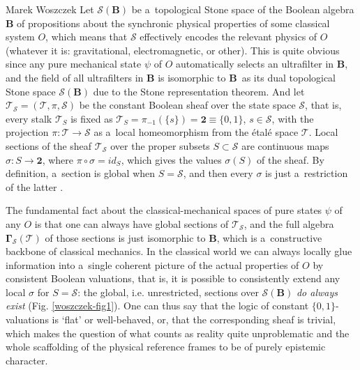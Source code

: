 \begin{artengenv}{Marek Woszczek}
Let $\mathcal{S}(\bm{B})$ be a~topological Stone space of the Boolean algebra $\bm{B}$ of propositions about the synchronic physical properties of some classical system $O$, which means that $\mathcal{S}$ effectively encodes the relevant physics of $O$ (whatever it is: gravitational, electromagnetic, or other). This is quite obvious since any pure mechanical state $\psi $ of $O$ automatically selects an ultrafilter in $\bm{B}$, and the field of all ultrafilters in $\bm{B}$ is isomorphic to $\bm{B}$~as its dual topological Stone space $\mathcal{S}(\bm{B})$ due to the Stone representation theorem. And let $\bm{\mathcal{T}}_{\mathcal{S}} = (\mathcal{T}, \pi, \mathcal{S})$ be the constant Boolean sheaf over the state space $\mathcal{S}$, that is, every stalk $\mathcal{T}_{S}$ is fixed as $\mathcal{T}_{S} = \pi_{-1}(\{s\}) = \bm{2} \equiv \{0,1\}$, $s{\in}\mathcal{S}$, with the projection $\pi:\mathcal{T}\to\mathcal{S}$ as a~local homeomorphism from the étalé space $\mathcal{T}$. Local sections of the sheaf $\bm{\mathcal{T}}_{\mathcal{S}}$ over the proper subsets $S{\subset}\mathcal{S}$ are continuous maps $\sigma :S\to \mathbf{2}$, where $\pi \circ \sigma = id_S$, which gives the values $\sigma(S)$ of the sheaf. By definition, a~section is global when $S = \mathcal{S}$, and then every $\sigma $ is just a~restriction of the latter
\parencites[][chap.II]{mac_lane_sheaves_1992}[][]{knoebel_sheaves_2012}.%


The fundamental fact about the classical-mechanical spaces of pure states $\psi $ of any $O$ is that one can always have global sections of $\bm{\mathcal{T}}_{\mathcal{S}}$, and the full algebra $\bm{\Gamma}_{\mathcal{S}}(\mathcal{T})$ of those sections is just isomorphic to $\bm{B}$, which is a~constructive backbone of classical mechanics. In the classical world we can always locally glue information into a~single coherent picture of the actual properties of $O$ by consistent Boolean valuations, that is, it is possible to consistently extend any local $\sigma$ for $S=\mathcal{S}$: the global, i.e. unrestricted, sections over $\mathcal{S}(\bm{B})$ \textit{do always exist} (Fig. \ref{woszczek-fig1}). One can thus say that the logic of constant $\{0,1\}$-valuations is ‘flat' or well-behaved, or, that the corresponding sheaf is trivial, which makes the question of what counts as reality quite unproblematic and the whole scaffolding of the physical reference frames to be of purely epistemic character.


\end{artengenv}

